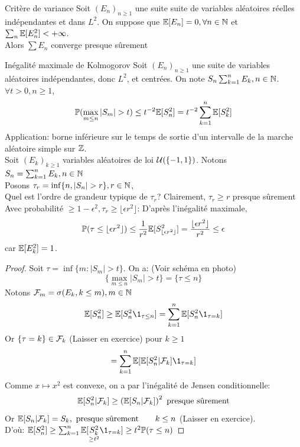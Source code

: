 \documentclass[]{report}
\begin{document}
    \begin{prop}{Critère de variance}{}
        Soit $(E_n)_{n\ge 1}$ une suite suite de variables aléatoires réelles indépendantes et dans $L^2$. On suppose que $\mathbb{E}[E_n]=0,\forall n\in \mathbb{N}$ et $\sum_{n}\mathbb{E}[E_n^2]<+\infty$.\\
        Alors $\sum E_n$ converge presque sûrement
    \end{prop}

    \begin{lm}{Inégalité maximale de Kolmogorov}{}
        Soit $(E_n)_{n\ge 1}$ une suite de variables aléatoires indépendantes, donc $L^2$, et centrées. On note $S_n\sum_{k=1}^{n}E_k,n\in \mathbb{N}$. $\forall t>0,n\ge 1$,
        \[\Pa(\max_{m\le n}|S_m|>t)\le t^{-2}\Ea[S_n^2]=t^{-2}\sum_{k=1}^{n}\Ea[S_k^2]\]
        Application: borne inférieure sur le temps de sortie d'un intervalle de la marche aléatoire simple sur $\mathbb{Z}$.\\
        Soit $(E_k)_{k\ge 1}$ variables aléatoires \iid de loi $\mathcal{U}(\{-1,1\})$. Notons $S_n=\sum_{k=1}^{n}E_k,n\in \mathbb{N}$\\
        Posons $\tau_r=\inf \{n,|S_n|>r\},r\in \N$,\\
        Quel est l'ordre de grandeur typique de $\tau_r$? Clairement, $\tau_r\ge r$ presque sûrement\\
        Avec probabilité $\ge 1-\epsilon^2,\tau_r\ge \lfloor \epsilon r^2 \rfloor$: D'après l'inégalité maximale,
        \[\mathbb{P}(\tau\le \lfloor \epsilon r^2 \rfloor)\le \frac{1}{r^2}\mathbb{E}[S_{\lfloor \epsilon r^2 \rfloor}^2]=\frac{\lfloor \epsilon r^2\rfloor}{r^2}\le \epsilon\]
        car $\mathbb{E}[E_k^2]=1$.
    \end{lm}

    \begin{proof}
        Soit $\tau=\inf\{m:|S_m|>t\}$. On a: (Voir schéma en photo)
        \[\{\max_{m\le n}|S_m|>t\}=\{\tau \le n\}\]
        Notons $\mathcal{F}_m=\sigma(E_k,k\le m),m\in \mathbb{N}$
        \[\Ea[S_n^2]\ge \Ea[S_n^2\1_{\tau\le n}]=\sum_{k=1}^{n}\Ea[S_n^2\1_{\tau=k}]\]
        Or $\{\tau=k\}\in \mathcal{F}_k$ (Laisser en exercice) pour $k\ge 1$
        \[=\sum_{k=1}^{n}\Ea[\Ea[S_n^2|\Fr_k]\1_{\tau= k}]\]
        Comme $x\mapsto x^2$ est convexe, on a par l'inégalité de Jensen conditionnelle:
        \[\mathbb{E}[S_n^2|\mathcal{F}_k]\ge \left(\mathbb{E}[S_n|\mathcal{F}_k]\right)^2\text{ presque sûrement}\]
        Or $\mathbb{E}[S_n|\mathcal{F}_k]=S_k,\text{ presque sûrement}\qquad k\le n$ (Laisser en exercice).\\
        D'où: $\Ea[S_n^2]\ge \sum_{k=1}^{n}\Ea[\underset{\ge t^2}{S_k^2}\1_{\tau=k}]\ge t^2\Pa(\tau\le n)$
    \end{proof}
\end{document}
